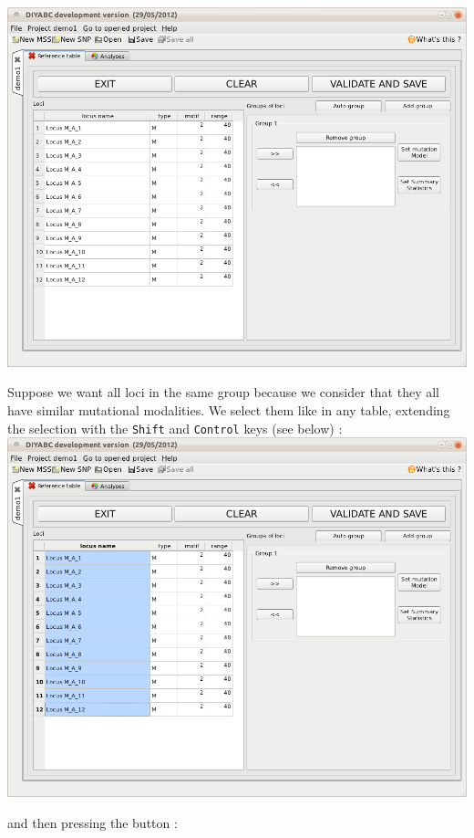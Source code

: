 \includegraphics[scale=0.35]{gui_pictures/Capture-DIYABC-16}

Suppose we want all loci in the same group because we consider that
they all have similar mutational modalities. We select them like in
any table, extending the selection with the \texttt{Shift} and \texttt{Control}
keys (see below) : \\


\includegraphics[scale=0.35]{gui_pictures/Capture-DIYABC-17}

and then pressing the \fbox{\textsf{$>>$}} button : \\


